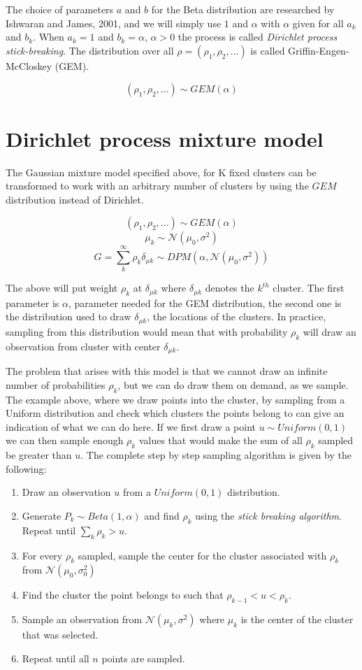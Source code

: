 \documentclass[12pt,a4paper]{article}
\begin{document}
The choice of parameters $a$ and $b$ for the Beta distribution are researched by Ishwaran and James, 2001, and we will simply use $1$ and $\alpha$ with $\alpha$ given for all $a_{k}$ and $b_{k}$. 
When $a_{k}=1$ and $b_{k}=\alpha$, $\alpha > 0$ the process is called \textit{Dirichlet process stick-breaking}. The distribution over all $\rho = (\rho_{1}, \rho_{2}, ...)$ is called Griffin-Engen-McCloskey (GEM). 

$$ (\rho_{1}, \rho_{2}, ...) \sim GEM(\alpha)$$

\section{Dirichlet process mixture model}

The Gaussian mixture model specified above, for K fixed clusters can be transformed to work with an arbitrary number of clusters by using the $GEM$ distribution instead of Dirichlet.

$$(\rho_{1}, \rho_{2}, ...) \sim GEM(\alpha)$$
$$\mu_{k} \sim \mathcal{N}(\mu_{0}, \sigma^2)$$
$$ G = \sum_{k}^{\infty}\rho_{k}\delta_{\mu k} \sim DPM(\alpha, \mathcal{N}(\mu_{0}, \sigma^2))$$

The above will put weight $\rho_{k}$ at $\delta_{\mu k}$ where $\delta_{\mu k}$ denotes the $k^{th}$ cluster. The first parameter is $\alpha$, parameter needed for the GEM distribution, the second one is the distribution used to draw $\delta_{\mu k}$, the locations of the clusters. In practice, sampling from this distribution would mean that with probability $\rho_{k}$ will draw an observation from cluster with center $\delta_{\mu k}$.

The problem that arises with this model is that we cannot draw an infinite number of probabilities $\rho_{k}$, but we can do draw them on demand, as we sample. The example above, where we draw points into the cluster, by sampling from a Uniform distribution and check which clusters the points belong to can give an indication of what we can do here. If we first draw a point $u \sim Uniform(0, 1)$ we can then sample enough $\rho_{k}$ values that would make the sum of all $\rho_{k}$ sampled be greater than $u$. The complete step by step sampling algorithm is given by the following:

\begin{enumerate}
    \item Draw an observation $u$ from a $Uniform(0, 1)$ distribution.  
    \item Generate $P_{k} \sim Beta(1, \alpha)$ and find $\rho_{k}$ using the \textit{stick breaking algorithm}. Repeat until $\sum_{k}\rho_{k} > u$. 
    \item For every $\rho_{k}$ sampled, sample the center for the cluster associated with $\rho_{k}$ from $\mathcal{N}(\mu_{0}, \sigma_{0}^2)$ 
    \item Find the cluster the point belongs to such that $\rho_{k-1} < u < \rho_{k}$.
    \item Sample an observation from $\mathcal{N}(\mu_{k}, \sigma^2)$ where $\mu_{k}$ is the center of the cluster that was selected.
    \item Repeat until all $n$ points are sampled.
\end{enumerate}
\end{document}
